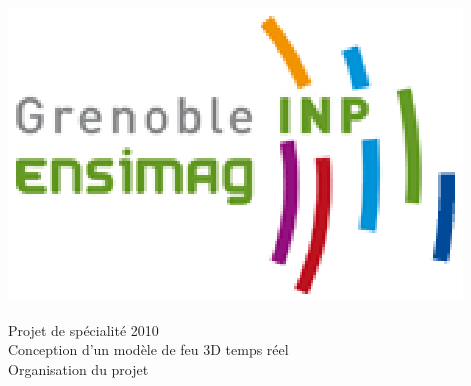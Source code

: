 \documentclass[a4paper,10pt]{article}
\begin{document}

\begin{center}
	\hspace{3cm}
	\includegraphics[scale=0.8]{logo.ps}

	\vspace{1cm}
	{\large Projet de spécialité 2010}\\
	{\Large Conception d'un modèle de feu 3D temps réel}\\
	{\large Organisation du projet}\\
	\vspace{1cm}



\end{center}
\end{document}

